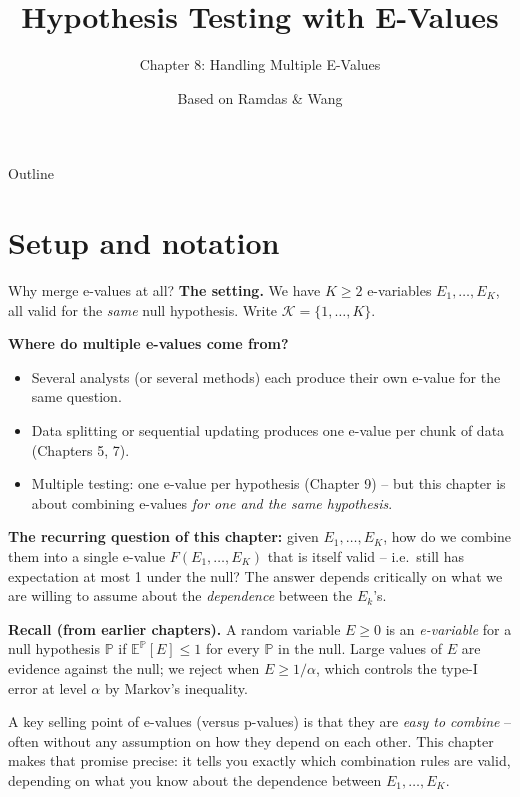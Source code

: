 \documentclass[aspectratio=169,10pt]{beamer}
\title[E-Values -- Ch.8]{Hypothesis Testing with E-Values}
\subtitle{Chapter 8: Handling Multiple E-Values}
\author{Based on Ramdas \& Wang}
\date{}
\newcommand{\E}{\mathbb{E}}
\newcommand{\Pb}{\mathbb{P}}
\newcommand{\calK}{\mathcal{K}}
\begin{document}
\begin{frame}
  \titlepage
\end{frame}

\begin{frame}[allowframebreaks]{Outline}
  \tableofcontents
\end{frame}

\section{Setup and notation}

\begin{frame}[allowframebreaks]{Why merge e-values at all?}
  \textbf{The setting.} We have $K \geq 2$ e-variables $E_1,\dots,E_K$, all valid for the \emph{same} null hypothesis. Write $\calK = \{1,\dots,K\}$.

  \vspace{0.3cm}
  \textbf{Where do multiple e-values come from?}
  \begin{itemize}
    \item Several analysts (or several methods) each produce their own e-value for the same question.
    \item Data splitting or sequential updating produces one e-value per chunk of data (Chapters 5, 7).
    \item Multiple testing: one e-value per hypothesis (Chapter 9) -- but this chapter is about combining e-values \emph{for one and the same hypothesis}.
  \end{itemize}

  \vspace{0.3cm}
  \textbf{The recurring question of this chapter:} given $E_1,\dots,E_K$, how do we combine them into a single e-value $F(E_1,\dots,E_K)$ that is itself valid -- i.e.\ still has expectation at most 1 under the null? The answer depends critically on what we are willing to assume about the \emph{dependence} between the $E_k$'s.

  \framebreak

  \textbf{Recall (from earlier chapters).} A random variable $E \geq 0$ is an \emph{e-variable} for a null hypothesis $\Pb$ if $\E^{\Pb}[E] \leq 1$ for every $\Pb$ in the null. Large values of $E$ are evidence against the null; we reject when $E \geq 1/\alpha$, which controls the type-I error at level $\alpha$ by Markov's inequality.

  \vspace{0.3cm}
  A key selling point of e-values (versus p-values) is that they are \emph{easy to combine} -- often without any assumption on how they depend on each other. This chapter makes that promise precise: it tells you exactly which combination rules are valid, depending on what you know about the dependence between $E_1,\dots,E_K$.
\end{frame}
\end{document}
